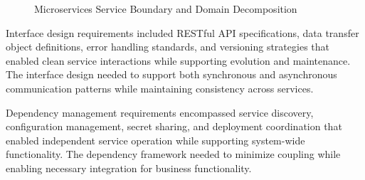 \begin{figure}[H]
\centering
\caption{Microservices Service Boundary and Domain Decomposition}
\label{fig:microservices-decomposition}
\end{figure}

Interface design requirements included RESTful API specifications, data transfer object definitions, error handling standards, and versioning strategies that enabled clean service interactions while supporting evolution and maintenance. The interface design needed to support both synchronous and asynchronous communication patterns while maintaining consistency across services.

Dependency management requirements encompassed service discovery, configuration management, secret sharing, and deployment coordination that enabled independent service operation while supporting system-wide functionality. The dependency framework needed to minimize coupling while enabling necessary integration for business functionality.